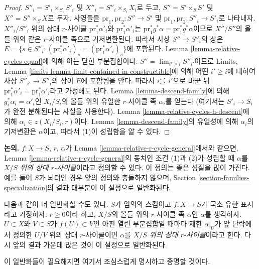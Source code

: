 \begin{proof}
\medskip\noindent
$S''_i = S'_i \times_{S_i} S'_i$ 및
$X''_i = S''_i \times_{S_i} X_i$로 두고,
$S'' = S' \times_S S'$ 및 $X'' = S'' \times_S X$로 두자. 사영들을
$\text{pr}_1, \text{pr}_2 : S'' \to S'$ 및
$\text{pr}_1, \text{pr}_2 : S''_i \to S'_i$로 나타내자.
$X''_i/S''_i$ 위의 상대 $r$-사이클
$\text{pr}_1^*\alpha'_i$와 $\text{pr}_1^*\alpha'_i$는
$\text{pr}_1^*g^*\alpha = \text{pr}_1^*g^*\alpha$이므로
$X''/S''$의 올들 위의 같은 $r$-사이클 족으로 기저변환된다. 따라서
사상 $S'' \to S''_i$의 상은
$E = \{s \in S''_i : (\text{pr}_1^*\alpha'_i)_s = (\text{pr}_1^*\alpha'_i)_s\}$에
포함된다. Lemma \ref{lemma-relative-cycles-equal}에 의해 이는 닫힌
부분집합이다. $S'' = \lim_{i' \geq i} S''_{i'}$이므로 Limits, Lemma
\ref{limits-lemma-limit-contained-in-constructible}에 의해 어떤
$i' \geq i$에 대하여 사상 $S''_{i'} \to S''_i$의 상이 $E$에
포함됨을 안다. 따라서 $i$를 $i'$으로 바꾼 뒤
$\text{pr}_1^*\alpha'_i = \text{pr}_1^*\alpha'_i$라고 가정해도 된다.
Lemma \ref{lemma-descend-family}에 의해 $g_i^*\alpha_i = \alpha'_i$인
$X_i/S_i$의 올들 위의 유일한 $r$-사이클 족 $\alpha_i$를 얻는다
(여기서는 $S'_i \to S_i$가 완전 분해된다는 사실을 사용한다). Lemma
\ref{lemma-relative-cycles-h-descent}에 의해
$\alpha_i \in z(X_i/S_i, r)$이다. Lemma
\ref{lemma-descend-family}의 유일성에 의해 $\alpha_i$의 기저변환은
$\alpha$이고, 따라서 (1)이 성립함을 알 수 있다.
\end{proof}

\noindent
{\bf 논의.}
$f : X \to S$, $r$, $\alpha$가 Lemma
\ref{lemma-relative-r-cycle-general}에서와 같으면, Lemma
\ref{lemma-relative-r-cycle-general}의 동치인 조건 (1)과 (2)가 성립할
때 $\alpha$를 {\it $X/S$ 위의 상대
$r$-사이클}이라고 정의할 수 있다. 이 정의는 좋은 성질을 많이 가진다.
예를 들어 $S$가 뇌터인 경우 앞의 정의와 충돌하지 않으며, Section
\ref{section-families-specialization}의 결과 대부분이 이 설정으로
일반화된다.

\medskip\noindent
다음과 같이 더 일반화할 수도 있다. $S$가 임의의 스킴이고
$f : X \to S$가 국소 유한 표시라고 가정하자. $r \geq 0$이라 하고,
$X/S$의 올들 위의 $r$-사이클 족 $\alpha$인 $\alpha$를 생각하자.
$U \subset X$와 $V \subset S$가 $f(U) \subset V$인 아핀 열린
부분집합일 때마다 제한 $\alpha|_U$가 앞 단락에서 정의한 $U/V$ 위의
상대 $r$-사이클이면 $\alpha$를 {\it $X/S$ 위의 상대 $r$-사이클}이라고
한다. 다시 앞의 결과 가운데 많은 것이 이 설정으로 일반화된다.

\medskip\noindent
이 일반화들이 필요해지면 여기서 조심스럽게 명시하고 증명할 것이다.

























